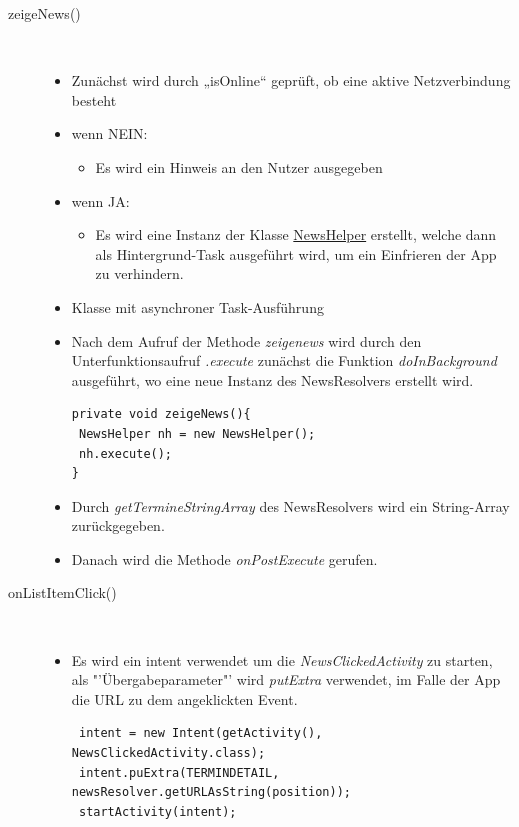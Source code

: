 \begin{description}
\item[zeigeNews()]\label{zeigenews}~\par
\begin{itemize}
\item Zunächst wird durch „isOnline“ geprüft, ob eine aktive Netzverbindung besteht
\item wenn NEIN:
\begin{itemize}
\item Es wird ein Hinweis an den Nutzer ausgegeben
\end{itemize}
\item wenn JA: 
\begin{itemize}
\item Es wird eine Instanz der Klasse \hyperref[NewsHelper]{NewsHelper} erstellt, welche dann als Hintergrund-Task ausgeführt wird, um ein Einfrieren der App zu verhindern.
\end{itemize}
\end{itemize}
\newpage
{}
\label{NewsHelper}
\begin{itemize}
\item Klasse mit asynchroner Task-Ausführung
\item Nach dem Aufruf der Methode \textit{zeigenews} wird durch den Unterfunktionsaufruf \textit{.execute} zunächst die Funktion \textit{doInBackground} ausgeführt, wo eine neue Instanz des NewsResolvers erstellt wird.
\begin{lstlisting} 
private void zeigeNews(){
 NewsHelper nh = new NewsHelper();
 nh.execute();
}
\end{lstlisting}   
\item Durch \textit{getTermineStringArray} des NewsResolvers wird ein String-Array zurückgegeben.
\item Danach wird die Methode \textit{onPostExecute} gerufen.
\end{itemize}
\item[onListItemClick()]~\par
\begin{itemize}
\item Es wird ein intent verwendet um die \textit{NewsClickedActivity} zu starten, als "'Übergabeparameter"' wird \textit{putExtra} verwendet, im Falle der App die URL zu dem angeklickten Event.
\begin{lstlisting}
 intent = new Intent(getActivity(), NewsClickedActivity.class);
 intent.puExtra(TERMINDETAIL, newsResolver.getURLAsString(position));
 startActivity(intent);
\end{lstlisting}
\end{itemize}


\end{description}
